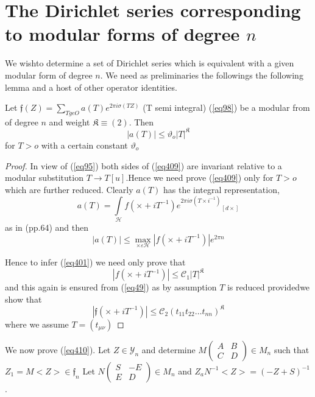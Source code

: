 
\chapter[The Dirichlet series corresponding ....]{The Dirichlet series corresponding to modular forms of
  degree $n$}%

We wish\pageoriginale to determine a set of Dirichlet series which is
equivalent with a given modular form of degree $n$. We need as 
preliminaries the followings the following lemma and a host of other
operator identities.   

\setcounter{lem}{26}
\begin{lem}%
Let $\mathfrak{f} (Z) = \sum_{ T ge O} a(T) e^{2 \pi i \sigma (T Z)}$ 
(T semi integral) (\ref{eq98}) be a modular from of degree $n$ and weight
$\mathfrak{K} \equiv (2)$. Then 
\begin{equation*}
|a (T)| \le \vartheta_o |T|^\mathfrak{K} \tag{409}\label{eq409}
\end{equation*}
for $T > o $ with a certain constant $\vartheta_o$ 
\end{lem}

\begin{proof} 
In view of (\ref{eq95}) both sides of (\ref{eq409}) are invariant relative to a
modular substitution $T \to T [u]$.Hence we need prove (\ref{eq409}) only
for $T > o$ which are further reduced. Clearly  $a(T)$ has the
integral representation, 
$$
a(T) =\int\limits_{\mathcal{H}} f (\times + i T^{-1}) e^{2 \pi i \sigma (T
  \times i ^{-1})} {_{[d \times]}} 
$$
as in (pp.64) and then  
$$
|a (T)| \le \max_{\times \varepsilon \mathcal{H}} |f (\times + i T
^{-1})| e^{2 \pi n} 
$$

Hence to infer (\ref{eq401}) we need only prove that 
$$
|f (\times + i T^{-1})| \le \mathscr{C}_1 |T|^\mathfrak{K} 
$$
and this again is ensured from (\ref{eq49}) as by assumption $T$ is reduced
provided\pageoriginale we show that  
\begin{equation*}
|\mathfrak{f} (\times + i T ^{-1})| \le \mathscr{C}_2 (t_{11} t_{22}
\dots t_{nn})^\mathfrak{K} \tag{410}\label{eq410} 
\end{equation*}
where we assume $T =(t_{\mu \nu})$
\end{proof}

We now prove (\ref{eq410}). Let $Z \in \mathscr{Y}_n$ and determine
$M \begin{pmatrix}  A & B\\ C & D\end{pmatrix} \in M_n$ such that $Z_1
  = M < Z > \in \mathfrak{f}_n$ Let $ N \begin{pmatrix}  S & -E
    \\ E & D\end{pmatrix} \in M_n$ and $Z_a N^{-1} < Z > = (-Z
    + S)^{-1}$. 

